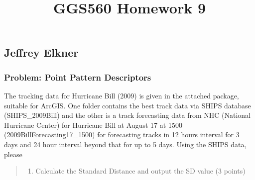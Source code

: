 \documentclass[11pt]{article}
\title{GGS560 Homework 9}
\providecommand{\tightlist}{%
      \setlength{\itemsep}{0pt}\setlength{\parskip}{0pt}}
\begin{document}
    
    
    \maketitle
    
    

    

    \hypertarget{jeffrey-elkner}{%
\subsection{Jeffrey Elkner}\label{jeffrey-elkner}}

\hypertarget{problem-point-pattern-descriptors}{%
\subsubsection{Problem: Point Pattern
Descriptors}\label{problem-point-pattern-descriptors}}

The tracking data for Hurricane Bill (2009) is given in the attached
package, suitable for ArcGIS. One folder contains the best track data
via SHIPS database (SHIPS\_2009Bill) and the other is a track
forecasting data from NHC (National Hurricane Center) for Hurricane Bill
at August 17 at 1500 (2009BillForecasting17\_1500) for forecasting
tracks in 12 hours interval for 3 days and 24 hour interval beyond that
for up to 5 days. Using the SHIPS data, please

\begin{quote}
\begin{enumerate}
\def\labelenumi{\alph{enumi}.}
\tightlist
\item
  Calculate the Standard Distance and output the SD value (3 points)
\end{enumerate}
\end{quote}

\vskip 0.2in
\end{document}
